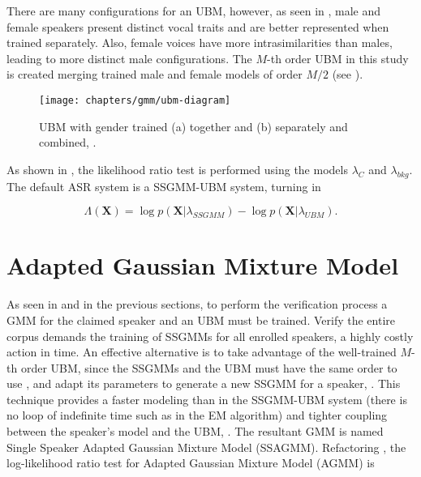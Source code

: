 There are many configurations for an UBM, however, as seen in , male and female speakers present distinct vocal traits and are better represented when trained separately. Also, female voices have more intrasimilarities than males, leading to more distinct male configurations. The $M$-th order UBM in this study is created merging trained male and female models of order $M/2$ (see ).

\begin{figure}[ht]
    \centering
    \texttt{[image: chapters/gmm/ubm-diagram]}
    \caption{UBM with gender trained (a) together and (b) separately and combined, .}
    \label{fig:ubm-diagram}
\end{figure}

As shown in , the likelihood ratio test is performed using the models $\lambda_{C}$ and $\lambda_{bkg}$. The default ASR system is a SSGMM-UBM system, turning  in

\begin{equation}
    \Lambda(\boldsymbol{X}) = \log p(\boldsymbol{X}|\lambda_{SSGMM}) - \log p(\boldsymbol{X}|\lambda_{UBM}).
    \label{eq:score_of_X_ssgmm_ubm}
\end{equation}

\section{Adapted Gaussian Mixture Model}
\label{sec:adapted-gmm}

As seen in  and in the previous sections, to perform the verification process a GMM for the claimed speaker and an UBM must be trained. Verify the entire corpus demands the training of SSGMMs for all enrolled speakers, a highly costly action in time. An effective alternative is to take advantage of the well-trained $M$-th order UBM, since the SSGMMs and the UBM must have the same order to use , and adapt its parameters to generate a new SSGMM for a speaker, . This technique provides a faster modeling than in the SSGMM-UBM system (there is no loop of indefinite time such as in the EM algorithm) and tighter coupling between the speaker’s model and the UBM, . The resultant GMM is named Single Speaker Adapted Gaussian Mixture Model (SSAGMM). Refactoring , the log-likelihood ratio test for Adapted Gaussian Mixture Model (AGMM) is


